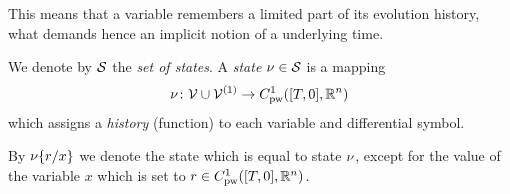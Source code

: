     This means that a variable remembers a limited part of its evolution history, what demands hence an implicit notion of a underlying time.

    We denote by $\states$ the \emph{set of states}. A \emph{state} $\asstate\in\states$ is a mapping
    \begin{equation}
        \asstate \from \allvars\cup\diffvars \to \statespace
    \end{equation}
    which assigns a \emph{history} (function) to each variable and differential symbol.

    By $\modif{\asstate}{x}{r}$ we denote the state which is equal to state $\asstate$, except for the value of the variable $x$ which is set to $r\in\statespace$.



